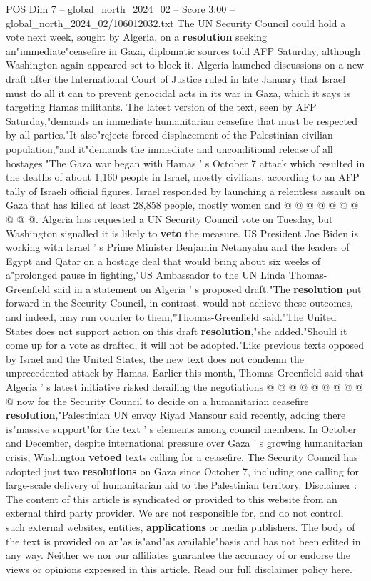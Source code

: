 \begin{textsample}{POS Dim 7 – global\_north\_2024\_02 – Score 3.00 – global\_north\_2024\_02/106012032.txt}  \label{ex:f7_pos_163}
The UN Security Council could hold a vote next week, sought by Algeria, on a \textbf{resolution} seeking an"immediate"ceasefire in Gaza, diplomatic sources told AFP Saturday, although Washington again appeared set to block it.
Algeria launched discussions on a new draft after the International Court of Justice ruled in late January that Israel must do all it can to prevent genocidal acts in its war in Gaza, which it says is targeting Hamas militants.
The latest version of the text, seen by AFP Saturday,"demands an immediate humanitarian ceasefire that must be respected by all parties."It also"rejects forced displacement of the Palestinian civilian population,"and it"demands the immediate and unconditional release of all hostages."The Gaza war began with Hamas ' s October 7 attack which resulted in the deaths of about 1,160 people in Israel, mostly civilians, according to an AFP tally of Israeli official figures.
Israel responded by launching a relentless assault on Gaza that has killed at least 28,858 people, mostly women and @ @ @ @ @ @ @ @ @ @.
Algeria has requested a UN Security Council vote on Tuesday, but Washington signalled it is likely to \textbf{veto} the measure.
US President Joe Biden is working with Israel ' s Prime Minister Benjamin Netanyahu and the leaders of Egypt and Qatar on a hostage deal that would bring about six weeks of a"prolonged pause in fighting,"US Ambassador to the UN Linda Thomas-Greenfield said in a statement on Algeria ' s proposed draft."The \textbf{resolution} put forward in the Security Council, in contrast, would not achieve these outcomes, and indeed, may run counter to them,"Thomas-Greenfield said."The United States does not support action on this draft \textbf{resolution},"she added."Should it come up for a vote as drafted, it will not be adopted."Like previous texts opposed by Israel and the United States, the new text does not condemn the unprecedented attack by Hamas.
Earlier this month, Thomas-Greenfield said that Algeria ' s latest initiative risked derailing the negotiations @ @ @ @ @ @ @ @ @ @ now for the Security Council to decide on a humanitarian ceasefire \textbf{resolution},"Palestinian UN envoy Riyad Mansour said recently, adding there is"massive support"for the text ' s elements among council members.
In October and December, despite international pressure over Gaza ' s growing humanitarian crisis, Washington \textbf{vetoed} texts calling for a ceasefire.
The Security Council has adopted just two \textbf{resolutions} on Gaza since October 7, including one calling for large-scale delivery of humanitarian aid to the Palestinian territory.
Disclaimer : The content of this article is syndicated or provided to this website from an external third party provider.
We are not responsible for, and do not control, such external websites, entities, \textbf{applications} or media publishers.
The body of the text is provided on an"as is"and"as available"basis and has not been edited in any way.
Neither we nor our affiliates guarantee the accuracy of or endorse the views or opinions expressed in this article.
Read our full disclaimer policy here.

\end{textsample}

